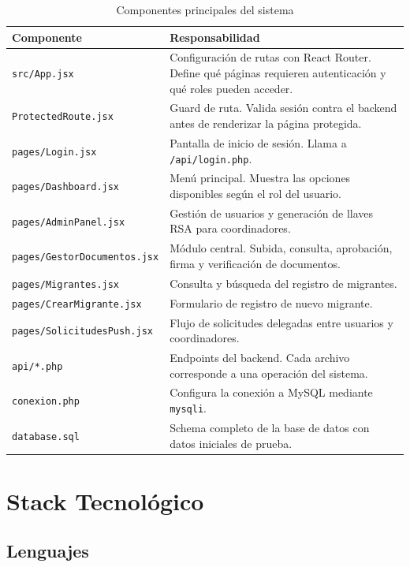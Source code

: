 \documentclass[10pt,letterpaper]{report}
\begin{document}
\begin{table}[H]
\centering
\caption{Componentes principales del sistema}
\label{tab:componentes}
\begin{tabular}{p{} p{}}
\toprule
\textbf{Componente} & \textbf{Responsabilidad} \\
\midrule
\texttt{src/App.jsx} & Configuración de rutas con React Router. Define qué páginas requieren autenticación y qué roles pueden acceder. \\
\texttt{ProtectedRoute.jsx} & Guard de ruta. Valida sesión contra el backend antes de renderizar la página protegida. \\
\texttt{pages/Login.jsx} & Pantalla de inicio de sesión. Llama a \texttt{/api/login.php}. \\
\texttt{pages/Dashboard.jsx} & Menú principal. Muestra las opciones disponibles según el rol del usuario. \\
\texttt{pages/AdminPanel.jsx} & Gestión de usuarios y generación de llaves RSA para coordinadores. \\
\texttt{pages/GestorDocumentos.jsx} & Módulo central. Subida, consulta, aprobación, firma y verificación de documentos. \\
\texttt{pages/Migrantes.jsx} & Consulta y búsqueda del registro de migrantes. \\
\texttt{pages/CrearMigrante.jsx} & Formulario de registro de nuevo migrante. \\
\texttt{pages/SolicitudesPush.jsx} & Flujo de solicitudes delegadas entre usuarios y coordinadores. \\
\texttt{api/*.php} & Endpoints del backend. Cada archivo corresponde a una operación del sistema. \\
\texttt{conexion.php} & Configura la conexión a MySQL mediante \texttt{mysqli}. \\
\texttt{database.sql} & Schema completo de la base de datos con datos iniciales de prueba. \\
\bottomrule
\end{tabular}
\end{table}

\chapter{Stack Tecnológico}

\section{Lenguajes}
\end{document}

